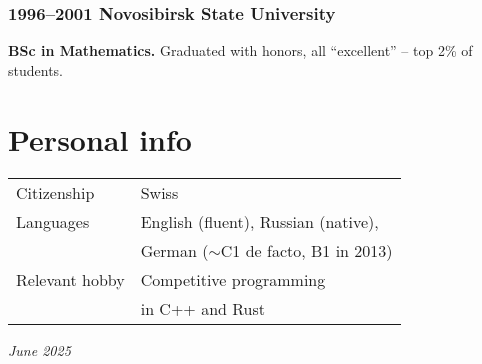 \documentclass[a4paper, twocolumn, 10pt]{article}
\begin{document}
\subsubsection*{1996--2001 Novosibirsk State University}

\textbf{BSc in Mathematics.} Graduated with honors, all ``excellent'' -- top 2\% of students.

\section*{Personal info}

\begin{tabular}{l l}
  \vspace{0.2cm}
  Citizenship & Swiss \\
  Languages & English (fluent), Russian (native), \\
  \vspace{0.2cm}
  & German ($\sim$C1 de facto, B1 in 2013) \\
  Relevant hobby & Competitive programming \\
  \vspace{0.2cm}
  & in C++ and Rust \\
\end{tabular}

\vspace*{\fill}
\hfill \emph{June 2025}
\end{document}
